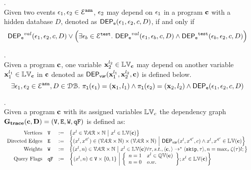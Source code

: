 %
%
\begin{defn}.
\label{def:event_dep}
\\ 
Given two events $\mathtt{\epsilon}_1, \mathtt{\epsilon}_2 \in \mathcal{E}^{\mathtt{{asn}}}$,
$\mathtt{\epsilon}_2$ may depend on $\mathtt{\epsilon}_1$ in a program ${\boldsymbol{\mathbf{c}}}$ with a hidden database $D$, denoted as $\mathsf{DEP_{\mathtt{e}}}(\mathtt{\epsilon}_1, \mathtt{\epsilon}_2, c, D)$,
if and only if
%
\[
\mathsf{DEP_{\mathtt{e}}}^{val}(\mathtt{\epsilon}_1, \mathtt{\epsilon}_2, c, D) 
\lor
\Big(
\exists \mathtt{\epsilon}_b \in \mathcal{E}^{\mathtt{{test}}}. ~ \mathsf{DEP_{\mathtt{e}}}^{val}(\mathtt{\epsilon}_1, \mathtt{\epsilon}_b, c, D) 
\land \mathsf{DEP_{\mathtt{e}}}^{\mathtt{{test}}}(\mathtt{\epsilon}_b, \mathtt{\epsilon}_2, c, D) 
\Big)
\] 
%
%
\end{defn}
%
\begin{defn}.
\label{def:var_dep}
\\
Given a program ${\boldsymbol{\mathbf{c}}}$, 
one variable ${\boldsymbol{\mathbf{x}}}_2^{l_2} \in \mathbb{LV}_{{\boldsymbol{\mathbf{c}}}}$ may depend on another variable 
${\boldsymbol{\mathbf{x}}}_1^{l_1} \in \mathbb{LV}_{{\boldsymbol{\mathbf{c}}}}$ in ${\boldsymbol{\mathbf{c}}}$ denoted as 
%
$\mathsf{DEP_{var}}({\boldsymbol{\mathbf{x}}}_1^{l_1}, {\boldsymbol{\mathbf{x}}}_2^{l_2}, {\boldsymbol{\mathbf{c}}})$ is defined below.
%
\[
\exists \mathtt{\epsilon}_1, \mathtt{\epsilon}_2 \in \mathcal{E}^{\mathtt{{asn}}}, D \in \mathcal{DB}. ~
\mathtt{\pi_{l}(\mathtt{\epsilon}_1)} = ({\boldsymbol{\mathbf{x}}}_1, l_1)
\land
\mathtt{\pi_{l}(\mathtt{\epsilon}_2)} = ({\boldsymbol{\mathbf{x}}}_2, l_2)
\land 
\mathsf{DEP_{\mathtt{e}}}(\mathtt{\epsilon}_1, \mathtt{\epsilon}_2, c, D)
\] 
%
%
\end{defn}
%
%
\begin{defn}.
\\
Given a program ${\boldsymbol{\mathbf{c}}}$ with its assigned variables $\mathbb{LV}_c$ 
the dependency graph $\bf{G_{trace}}({\boldsymbol{\mathbf{c}}}, D) = (\mathtt{V}, \mathtt{E}, \mathtt{W}, \mathtt{qF})$ is defined as:
%
\[
\begin{array}{rlcl}
  \text{Vertices} &
  \vertxs & := & \left\{ 
  x^l \in \mathcal{VAR} \times \mathbb{N}
  ~ \middle\vert ~
  x^l \in \lvar({\ssa{c}})
  \right\}
  \\
  \text{Directed Edges} &
  \edges & := & 
  \left\{ 
  (x^l, x'^{l'}) \in (\mathcal{VAR} \times \mathbb{N}) \times (\mathcal{VAR} \times \mathbb{N})
  ~ \middle\vert ~
  \vardep(x^l, x'^{l'}, c) \land
  x^l, x'^{l'} \in \lvar({\ssa{c}})
  \right\}
  \\
  \text{Weights} &
  \weights & := & 
  \left\{ 
  (x^l, n) \in \mathcal{VAR} \times \mathbb{N}
  ~ \middle\vert ~ 
  x^l \in \lvar({\ssa{c}}) 
  \forall \vtrace, s.t.,
  \config{\ssa{c}, } \to^{*} \config{\eskip, \vtrace},
  n = \max_{\vtrace}\vcounter(\vtrace)l; 
  \right\}
  \\
  \text{Query Flags} &
  \qflag & := & 
  \left\{(x^l, n)  \in \vertxs \times \{0, 1\} 
  ~ \middle\vert ~
  \left\{
  \begin{array}{ll}
  n = 1 & x^l \in \qvar({\ssa{c}}) \\ 
  n = 0 & o.w.
  \end{array}
  \right\};
  x^l \in \lvar({\ssa{c}})
  \right\}
\end{array}
\]
\end{defn}
